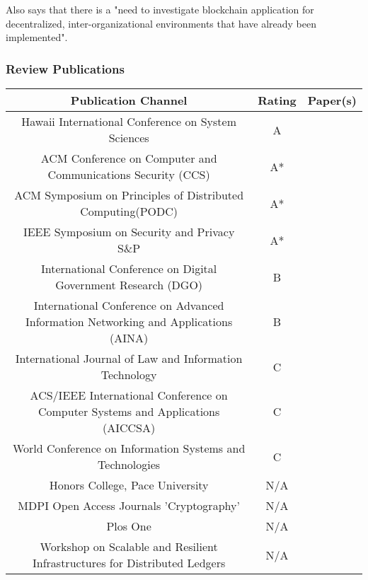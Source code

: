Also \cite{2017_Naerland} says that there is a "need to investigate blockchain application for decentralized, inter-organizational environments that have already been implemented".

\clearpage
\begin{landscape}
\subsubsection{Review Publications}
\label{subsubsec:review_publications}
\begin{center}
\begin{tabular}{ |c|c|c| }
	\hline
 	Publication Channel & Rating &  Paper(s) \\ [0.5ex] 
 	\hline\hline
	 Hawaii International Conference on System Sciences & A & \cite{2018_Li} \\ 
	 \hline
 	ACM Conference on Computer and Communications Security (CCS) & A* & \cite{2016_Karame} \\ 
 	\hline
 	ACM Symposium on Principles of Distributed Computing(PODC) & A* & \cite{2017_Herlihy} \\ 
 	\hline
 	IEEE Symposium on Security and Privacy S\&P & A* & \cite{2015_Bonneau} \\ 
 	\hline
 	 International Conference on Digital Government Research (DGO) & B & \cite{2018_Batubara} \\ 
 	 \hline
 	 International Conference on Advanced Information Networking and Applications (AINA) & B & \cite{2018_Chalaemwongwan} \\ 
 	 \hline
 	 International Journal of Law and Information Technology & C & \cite{2017_Cuccuru} \\ 
 	 \hline
 	 ACS/IEEE International Conference on Computer Systems and Applications (AICCSA) & C & \cite{2016_Conoscenti} \\ 
 	\hline
 	World Conference on Information Systems and Technologies & C & \cite{2018_Brandao} \\ 
 	\hline
 	Honors College, Pace University & N/A & \cite{2017_Kogon} \\ 
 	\hline
 	MDPI Open Access Journals 'Cryptography'  & N/A & \cite{2017_Romano} \\ 
 	\hline
 	Plos One  & N/A & \cite{2016_Yli-Huumo} \\ 
 	\hline
 	Workshop on Scalable and Resilient Infrastructures for Distributed Ledgers  & N/A & \cite{2017_Bartoletti} \\ 

\end{tabular}
\end{center}
\end{landscape}
